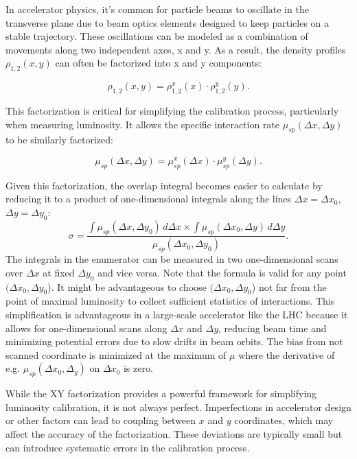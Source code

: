 In accelerator physics, it's common for particle beams to oscillate in the transverse plane due to beam optics elements designed to keep particles on a stable trajectory. These oscillations can be modeled as a combination of movements along two independent axes, x and y. As a result, the density profiles \(\rho _{1,2}(x, y)\) can often be factorized into x and y components:

\begin{equation}
\rho _{1,2}(x, y) = \rho _{1,2}^x(x) \cdot \rho _{1,2}^y(y).
\end{equation}

This factorization is critical for simplifying the calibration process, particularly when measuring luminosity. It allows the specific interaction rate \(\mu_{sp}(\Delta x, \Delta y)\) to be similarly factorized:

\begin{equation}
\mu _{sp}(\Delta x, \Delta y) = \mu ^x_{sp}(\Delta x) \cdot \mu ^y_{sp}(\Delta y).
\end{equation}

Given this factorization, the overlap integral becomes easier to calculate by reducing it to a product of one-dimensional integrals  along the lines $\Delta x = \Delta x_0$, $\Delta y = \Delta y_0$:
\begin{equation}
\sigma = \frac{\int \mu _{sp}(\Delta x, \Delta y_0)\, d\Delta x \times \int \mu _{sp}(\Delta x_0, \Delta y)\, d\Delta y}{\mu _{sp}(\Delta x_0, \Delta y_0)}.\label{definition_sigma_vdm}
\end{equation}
The integrals in the enumerator can be measured in two one-dimensional scans over $\Delta x$ at fixed $\Delta y_0$ and vice versa. Note that the formula is valid for any point $(\Delta x_0, \Delta y_0$). It might be advantageous to choose $(\Delta x_0, \Delta y_0$) not far from the point of maximal luminosity to collect sufficient statistics of interactions. This simplification is advantageous in a large-scale accelerator like the LHC because it allows for one-dimensional scans along \(\Delta x\) and \(\Delta y\), reducing beam time and minimizing potential errors due to slow drifts in beam orbits. The bias from not scanned coordinate is minimized at the maximum of $\mu$ where the derivative of e.g. $\mu_{sp}(\Delta x_0, \Delta_y)$ on $\Delta x_0$ is zero.

While the XY factorization provides a powerful framework for simplifying luminosity calibration, it is not always perfect. Imperfections in accelerator design or other factors can lead to coupling between \(x\) and \(y\) coordinates, which may affect the accuracy of the factorization. These deviations are typically small but can introduce systematic errors in the calibration process.


